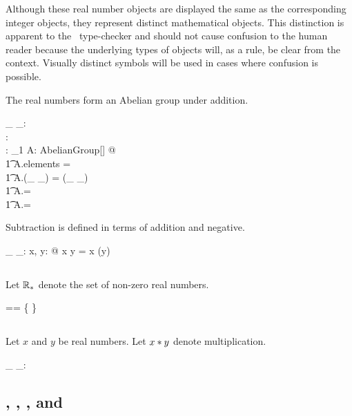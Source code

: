 \documentclass[12pt]{article}
\begin{document}
Although these real number objects are displayed the same as the corresponding integer objects, 
they represent distinct mathematical objects.
This distinction is apparent to the \fuzz\ type-checker and should not cause confusion to the human reader
because the underlying types of objects will, as a rule, be clear from the context.
Visually distinct symbols will be used in cases where confusion is possible.

The real numbers form an Abelian group under addition.

\begin{axdef}
\_ \addR \_: \RR \cross \RR \fun \RR \\
\zeroR: \RR \\
\negR: \RR \fun \RR
\where
\exists_1 A: AbelianGroup[\RR] @ \\
\t1	A.elements = \RR \land \\
\t1	A.(\_ \addG \_) = (\_ \addR \_) \land \\
\t1	A.\zeroG = \zeroR \land \\
\t1	A.\negG = \negR
\end{axdef}

Subtraction is defined in terms of addition and negative.

\begin{axdef}
\_ \subR \_: \RR \cross \RR \fun \RR
\where
\forall x, y: \RR @ x \subR y = x \addR (\negR y)
\end{axdef}

\subsection{}

Let $\mathbb{R}_{*}$ denote the set of non-zero real numbers.

\begin{zed}
\Rnz == \RR \setminus \{ \zeroR \}
\end{zed}

\subsection{}

Let $x$ and $y$ be real numbers.
Let $x \mathbin{*} y$ denote multiplication.

\begin{axdef}
\_ \mulR \_: \RR \cross \RR \fun \RR
\end{axdef}

\subsection{, , , and }
\end{document}
